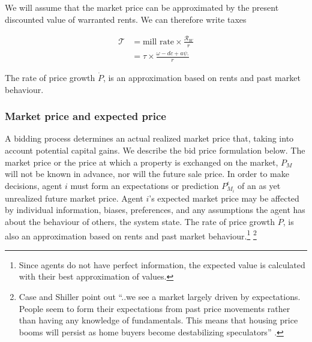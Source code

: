 We will assume that the market price can be approximated by the present discounted value of warranted  rents.  We can therefore write taxes

\begin{align*}
\mathcal{T} &= \text{mill rate} \times \frac{\mathcal{R}_W}{r} \\
&= \tau \times \frac{\omega- {dc} + a\psi.}{r}
\end{align*}


The rate of price growth $\dot P$, is an approximation based on rents and past market behaviour.

\subsubsection{Market price and expected price} \label{section-market-price}

A bidding process determines an actual realized market price that, taking into account potential capital gains. We describe the bid price formulation below. The \gls{market price} or the price at which a property is exchanged on the market, $P_M$ will not be known in advance, nor will the future sale price. In order to make decisions, agent $i$ must form an \glspl{expectation} or prediction $P_{M_i}^{\epsilon}$ of an as yet unrealized future market price. Agent $i$'s expected market price may be affected by individual information, biases, preferences, and any assumptions the agent has about the behaviour of others, the system state. The rate of price growth $\dot P$, is also an approximation based on rents and past market behaviour.\footnote{Since agents do not have perfect information, the expected value is calculated with their best approximation of values.} 
 \footnote{Case and Shiller point out ``..we see a market largely driven by expectations. People seem to form their expectations from past price movements rather than having any knowledge of fundamentals. This means that housing price booms will persist as home buyers become destabilizing speculators''  \cite{caseThereBubbleHousing2003}.} 




